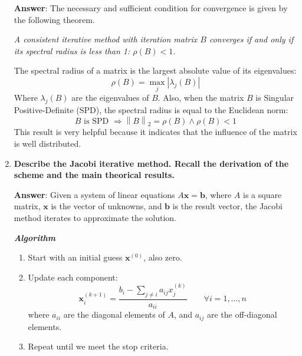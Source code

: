 \begin{enumerate}[label=\textcolor{Green3}{\textbf{\arabic*.}}]
    \textbf{Answer}: The necessary and sufficient condition for convergence is given by the following theorem.
    
    \emph{A consistent iterative method with iteration matrix $B$ converges if and only if its spectral radius is less than 1: $\rho\left(B\right) < 1$.}

    The spectral radius of a matrix is the largest absolute value of its eigenvalues:
    \begin{equation*}
        \rho\left(B\right) = \underset{j}{\max} \left|\lambda_{j}\left(B\right)\right|
    \end{equation*}
    Where $\lambda_{j}\left(B\right)$ are the eigenvalues of $B$. Also, when the matrix $B$ is Singular Positive-Definite (SPD), the spectral radius is equal to the Euclidean norm:
    \begin{equation*}
        B \text{ is SPD } \Rightarrow \left\| B \right\|_{2} = \rho\left(B\right) \land \rho\left(B\right) < 1
    \end{equation*}
    This result is very helpful because it indicates that the influence of the matrix is well distributed.




    \item \textcolor{Green3}{\textbf{%
        Describe the Jacobi iterative method. Recall the derivation of the scheme and the main theorical results.
    }}

    \textbf{Answer}: Given a system of linear equations $A\mathbf{x} = \mathbf{b}$, where $A$ is a square matrix, $\mathbf{x}$ is the vector of unknowns, and $\mathbf{b}$ is the result vector, the Jacobi method iterates to approximate the solution.

    \textbf{\emph{Algorithm}}
    \begin{enumerate}
        \item Start with an initial guess $\mathbf{x}^{\left(0\right)}$, also zero.
        \item Update each component:
        \begin{equation*}
            \mathbf{x}_{i}^{\left(k+1\right)} = \dfrac{
                b_{i} - \displaystyle\sum_{j \ne i} a_{ij}x_{j}^{\left(k\right)}
            }{a_{ii}} \hspace{2em} \forall i = 1, \dots, n
        \end{equation*}
        where $a_{ii}$ are the diagonal elements of $A$, and $a_{ij}$ are the off-diagonal elements.
        \item Repeat until we meet the stop criteria.
    \end{enumerate}


\end{enumerate}
